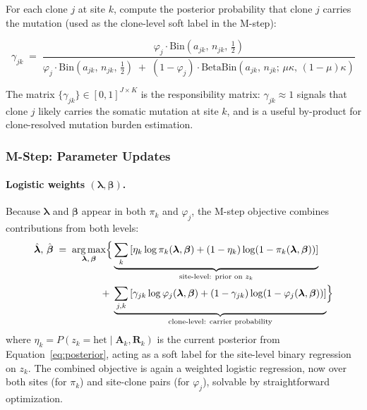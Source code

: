\documentclass{article}
\begin{document}
For each clone $j$ at site $k$, compute the posterior probability that clone
$j$ carries the mutation (used as the clone-level soft label in the M-step):

\begin{equation}
  \gamma_{jk}
  \;=\;
  \frac{
    \varphi_j \cdot \mathrm{Bin}\!\left(a_{jk},\,n_{jk},\,\tfrac{1}{2}\right)
  }{
    \varphi_j \cdot \mathrm{Bin}\!\left(a_{jk},\,n_{jk},\,\tfrac{1}{2}\right)
    \;+\;
    (1 - \varphi_j)\cdot \mathrm{BetaBin}\!\left(a_{jk},\,n_{jk};\,\mu\kappa,\,(1{-}\mu)\kappa\right)
  }
  \label{eq:estep}
\end{equation}

The matrix $\{\gamma_{jk}\} \in [0,1]^{J \times K}$ is the responsibility
matrix: $\gamma_{jk} \approx 1$ signals that clone $j$ likely carries the
somatic mutation at site $k$, and is a useful by-product for clone-resolved
mutation burden estimation.

\subsubsection*{M-Step: Parameter Updates}

\paragraph{Logistic weights $(\boldsymbol{\lambda}, \boldsymbol{\beta})$.}
Because $\boldsymbol{\lambda}$ and $\boldsymbol{\beta}$ appear in both $\pi_k$
and $\varphi_j$, the M-step objective combines contributions from both levels:
\begin{align}
  \hat{\boldsymbol{\lambda}},\, \hat{\boldsymbol{\beta}}
  \;=\;
  \operatorname*{arg\,max}_{\boldsymbol{\lambda},\,\boldsymbol{\beta}}
  \Bigl\{
  &\underbrace{\sum_{k}
  \left[
    \eta_k \log\pi_k(\boldsymbol{\lambda},\boldsymbol{\beta})
    + (1-\eta_k)\log(1-\pi_k(\boldsymbol{\lambda},\boldsymbol{\beta}))
  \right]}_{\text{site-level: prior on }z_k}
  \notag \\
  +\;
  &\underbrace{\sum_{j,k}
  \left[
    \gamma_{jk}\log\varphi_j(\boldsymbol{\lambda},\boldsymbol{\beta})
    + (1-\gamma_{jk})\log(1-\varphi_j(\boldsymbol{\lambda},\boldsymbol{\beta}))
  \right]}_{\text{clone-level: carrier probability}}
  \Bigr\}
  \label{eq:mstep_lambda}
\end{align}
where $\eta_k = P(z_k = \mathrm{het} \mid \mathbf{A}_k, \mathbf{R}_k)$ is the
current posterior from Equation~\eqref{eq:posterior}, acting as a soft label
for the site-level binary regression on $z_k$.  The combined objective is again
a weighted logistic regression, now over both sites (for $\pi_k$) and
site-clone pairs (for $\varphi_j$), solvable by straightforward optimization.
\end{document}
